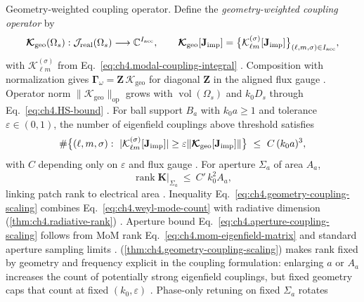 Geometry-weighted coupling operator. Define the \emph{geometry-weighted coupling operator} by
\begin{equation}
\label{eq:ch4.geometry-coupling-operator}
\boldsymbol{\mathcal{K}}_{\mathrm{geo}}(\Omega_{s})
:
\mathcal{J}_{\mathrm{real}}(\Omega_{s})
\longrightarrow
\mathbb{C}^{I_{\mathrm{acc}}},
\qquad
\boldsymbol{\mathcal{K}}_{\mathrm{geo}}[\mathbf{J}_{\mathrm{imp}}]
=
\big\{\mathcal{K}_{\ell m}^{(\sigma)}[\mathbf{J}_{\mathrm{imp}}]\big\}_{(\ell,m,\sigma)\in I_{\mathrm{acc}}},
\end{equation}
with \(\mathcal{K}_{\ell m}^{(\sigma)}\) from Eq.~\eqref{eq:ch4.modal-coupling-integral} \cite{stratton1941}.
Composition with normalization gives \(\boldsymbol{\Gamma}_\omega=\mathbf{Z}\,\boldsymbol{\mathcal{K}}_{\mathrm{geo}}\) for
diagonal \(\mathbf{Z}\) in the aligned flux gauge \cite{hansen1988}. Operator norm
\(\|\boldsymbol{\mathcal{K}}_{\mathrm{geo}}\|_{\mathrm{op}}\) grows with \(\operatorname{vol}(\Omega_{s})\) and
\(k_{0}D_{s}\) through Eq.~\eqref{eq:ch4.HS-bound} \cite{stratton1941}.
\label{thm:ch4.geometry-coupling-scaling}
For ball support \(B_{a}\) with \(k_{0}a\ge1\) and tolerance \(\varepsilon\in(0,1)\), the number of eigenfield
couplings above threshold satisfies
\begin{equation}
\label{eq:ch4.geometry-coupling-scaling}
\#\big\{(\ell,m,\sigma):\ |\mathcal{K}_{\ell m}^{(\sigma)}[\mathbf{J}_{\mathrm{imp}}]|\ge\varepsilon\|\boldsymbol{\mathcal{K}}_{\mathrm{geo}}[\mathbf{J}_{\mathrm{imp}}]\|\big\}
\ \le\
C\,(k_{0}a)^{3},
\end{equation}
with \(C\) depending only on \(\varepsilon\) and flux gauge \cite{stratton1941}. For aperture
\(\Sigma_{a}\) of area \(A_{a}\),
\begin{equation}
\label{eq:ch4.aperture-coupling-scaling}
\operatorname{rank}\mathbf{K}\big|_{\Sigma_{a}}
\ \le\
C'\,k_{0}^{2}A_{a},
\end{equation}
linking patch rank to electrical area \cite{collin2001}.
Inequality Eq.~\eqref{eq:ch4.geometry-coupling-scaling} combines
Eq.~\eqref{eq:ch4.weyl-mode-count} with radiative dimension (\ref{thm:ch4.radiative-rank})
\cite{stratton1941}. Aperture bound Eq.~\eqref{eq:ch4.aperture-coupling-scaling} follows from
MoM rank Eq.~\eqref{eq:ch4.mom-eigenfield-matrix} and standard aperture sampling limits
\cite{harrington2001}.
(\ref{thm:ch4.geometry-coupling-scaling}) makes rank fixed by geometry and frequency explicit in the coupling formulation: enlarging
\(a\) or \(A_{a}\) increases the count of potentially strong eigenfield couplings, but fixed geometry caps that count at
fixed \((k_{0},\varepsilon)\) \cite{devaney2004}. Phase-only retuning on fixed \(\Sigma_{a}\) rotates
